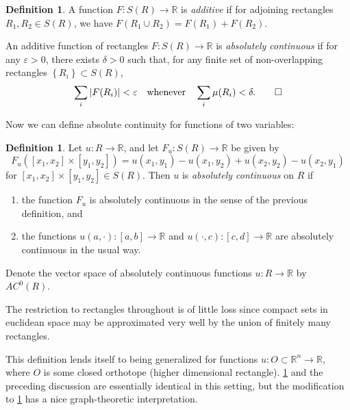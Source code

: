 \documentclass[11pt,leqno]{article}
\theoremstyle{plain}
\theoremstyle{definition}
\newtheorem{definition/}[lem]{Definition}
\newenvironment{definition}
  {\renewcommand{\qedsymbol}{\textdagger}%
   \pushQED{\qed}\begin{definition/}}
  {\popQED\end{definition/}}
\numberwithin{equation}{section}
\numberwithin{lem}{section}
\newcommand{\cbr}[1]{\left\{#1\right\}}
\begin{document}
\begin{definition}\label{def1}
    A function $F\colon S(R)\to \mathbb R$ is \textit{additive} if for adjoining rectangles $R_1,R_2\in S(R)$, we have $F(R_1\cup R_2) = F(R_1) + F(R_2)$.

    An additive function of rectangles $F\colon S(R)\to \mathbb R$ is \textit{absolutely continuous} if for any $\varepsilon>0$, there exists $\delta>0$ such that, for any finite set of non-overlapping rectangles $\cbr{R_i}\subset S(R)$,
    \begin{equation}
        \sum_{i}|F(R_i)| < \varepsilon\quad \text{whenever}\quad \sum_i\mu(R_i) < \delta.\qedhere
    \end{equation}
\end{definition}

Now we can define absolute continuity for functions of two variables:

\begin{definition}\label{def2}
    Let $u\colon R\to \mathbb R$, and let $F_u\colon S(R)\to \mathbb R$ be given by 
    \begin{equation}
        F_u([x_1,x_2]\times[y_1,y_2]) = u(x_1,y_1)-u(x_1,y_2) + u(x_2,y_2)-u(x_2,y_1)
    \end{equation}
    for $[x_1,x_2]\times[y_1,y_2]\in S(R)$. Then $u$ is \textit{absolutely continuous} on $R$ if \begin{enumerate}[label=(\arabic*)]
        \item the function $F_u$ is absolutely continuous in the sense of the previous definition, and
        \item the functions $u(a,\cdot)\colon [a,b]\to\mathbb R$ and $u(\cdot,c)\colon [c,d]\to\mathbb R$ are absolutely continuous in the usual way.
    \end{enumerate}
    Denote the vector space of absolutely continuous functions $u\colon R\to\mathbb R$ by $AC^0(R)$.
\end{definition}

The restriction to rectangles throughout is of little loss since compact sets in euclidean space may be approximated very well by the union of finitely many rectangles.

This definition lends itself to being generalized for functions $u\colon O\subset \mathbb R^n \to \mathbb R$, where $O$ is some closed orthotope (higher dimensional rectangle). \cref{def1} and the preceding discussion are essentially identical in this setting, but the modification to \cref{def2} has a nice graph-theoretic interpretation.
\end{document}
